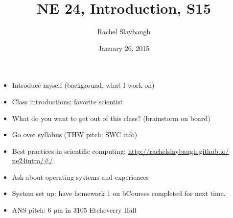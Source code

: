 \documentclass[12pt]{article}
\title{NE 24, Introduction, S15}
\author{Rachel Slaybaugh}
\date{January 26, 2015}
\begin{document}
\maketitle

\begin{itemize}
\item Introduce myself (background, what I work on)

\item Class introductions; favorite scientist

\item What do you want to get out of this class? (brainstorm on board)

\item Go over syllabus (THW pitch; SWC info)

\item Best practices in scientific computing: \href{http://rachelslaybaugh.github.io/ne24intro/\#/}{http://rachelslaybaugh.github.io/\\ne24intro/\#/}

\item Ask about operating systems and experiences

\item System set up: have homework 1 on bCourses completed for next time.

\item ANS pitch: 6 pm in 3105 Etcheverry Hall

\end{itemize}
\end{document}

